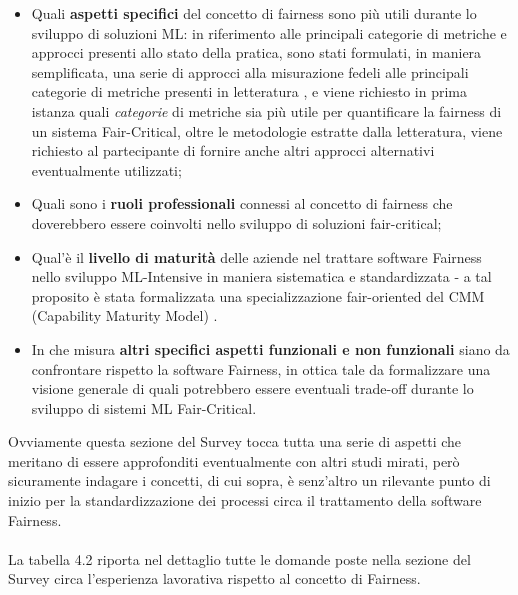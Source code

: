    \begin{itemize}
       \item Quali \textbf{aspetti specifici} del concetto di fairness sono più utili durante lo sviluppo di soluzioni ML: in riferimento alle principali categorie di metriche e approcci presenti allo stato della pratica, sono stati formulati, in maniera semplificata, una serie di approcci alla misurazione fedeli alle principali categorie di metriche presenti in letteratura  \cite{FairnessDefinitionExplained}, e viene richiesto in prima istanza quali \emph{categorie} di metriche sia più utile per quantificare la fairness di un sistema Fair-Critical, oltre le metodologie estratte dalla letteratura, viene richiesto al partecipante di fornire anche altri approcci alternativi eventualmente utilizzati;
       \item Quali sono i \textbf{ruoli professionali} connessi al concetto di fairness che doverebbero essere coinvolti nello sviluppo di soluzioni fair-critical;
       \item Qual'è il \textbf{livello di maturità} delle aziende nel trattare software Fairness nello sviluppo ML-Intensive in maniera sistematica e standardizzata - a tal proposito è stata formalizzata una specializzazione fair-oriented del CMM (Capability Maturity Model) \cite{CMM}.
       \item In che misura \textbf{altri specifici aspetti funzionali e non funzionali} siano da confrontare rispetto la software Fairness, in ottica tale da formalizzare una visione generale di quali potrebbero essere eventuali trade-off durante lo sviluppo di sistemi ML Fair-Critical.
   \end{itemize}
   
   Ovviamente questa sezione del Survey tocca tutta una serie di aspetti che meritano di essere approfonditi eventualmente con altri studi mirati, però sicuramente indagare i concetti, di cui sopra, è senz'altro un rilevante punto di inizio per la standardizzazione dei processi circa il trattamento della software Fairness. \\\\
   
   La tabella 4.2 riporta nel dettaglio tutte le domande poste nella sezione del Survey circa l'esperienza lavorativa rispetto al concetto di Fairness.
   
